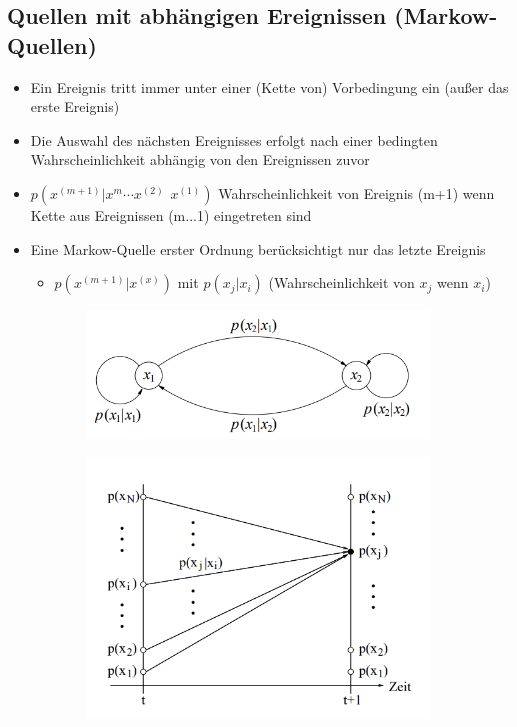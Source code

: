 \documentclass[12pt,a4paper]{article}
\begin{document}
\subsection{Quellen mit abhängigen Ereignissen (Markow-Quellen)}
\begin{itemize}
\item Ein Ereignis tritt immer unter einer (Kette von) Vorbedingung ein (außer das erste Ereignis)
\item Die Auswahl des nächsten Ereignisses erfolgt nach einer bedingten Wahrscheinlichkeit abhängig von den Ereignissen zuvor
\item $p(x^{(m+1)}\vert x^{m}\cdots x^{(2)}\hspace{5pt}x^{(1)})$ Wahrscheinlichkeit von Ereignis (m+1) wenn Kette aus Ereignissen (m...1) eingetreten sind
\item Eine Markow-Quelle erster Ordnung berücksichtigt nur das letzte Ereignis
\begin{itemize}
\item $p(x^{(m+1)}\vert x^{(x)})$ mit $p(x_j\vert x_i)$ (Wahrscheinlichkeit von $x_j$ wenn $x_i$)
\end{itemize}
\end{itemize}

\begin{figure}[h]
\begin{subfigure}{0.5\textwidth}
\includegraphics[scale=0.5]{resources/markow_graph.png}
\end{subfigure}
\begin{subfigure}{0.5\textwidth}
\includegraphics[scale=0.5]{resources/markow_diag.png}
\end{subfigure}
\end{figure}
\end{document}
